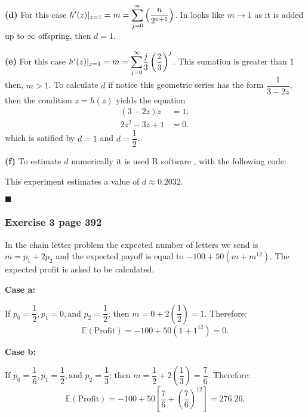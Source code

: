 \documentclass[10pt,leter,openany]{article}
\begin{document}
			\textbf{(d)} For this case $h'(z)|_{z=1} = m = \mathlarger\sum_{j=0}^{\infty} \left( \dfrac{n}{2^{n+1}}\right)$. In looks like $m \rightarrow 1$ as it is added up to $\infty$ offspring, then $d = 1$.

			\textbf{(e)} For this case $h'(z)|_{z=1} = m = \mathlarger\sum_{j=0}^{\infty}  \dfrac{j}{3} \left( \dfrac{2}{3}\right) ^{j}$. This sumation is greater than 1 then, $m > 1$. To calculate $d$ if notice this geometric series has the form $ \dfrac{1}{3-2z}$, then the condition $z = h(z)$ yields the equation \begin{equation*}
				\begin{aligned}
				(3-2z)z & = 1,\\
				2z^{2}- 3z + 1& = 0.
			\end{aligned}
			\end{equation*} which is satified by $ d = 1 $ and $ d = \dfrac{1}{2}$. 
		
		\textbf{(f)} To estimate $d$ numerically it is used R software \citep{r}, with the following code:
		
		
		This experiment estimates a value of $d \approx 0.2032$.
			
						\begin{flushright}
							$\blacksquare $ 
						\end{flushright}
					
		\subsubsection{Exercise 3 page 392}
		
			In the chain letter problem the expected number of letters we send is $ m = p_{1} + 2p_{2}$ and the expected payoff is equal to $-100 + 50(m+m^{12})$. The expected profit is asked to be calculated.
			
			\textbf{Case a:}
			
			If $p_{0} = \dfrac{1}{2}, p_{1} = 0, \mbox{and } p_{2}=\dfrac{1}{2}$; then $m = 0+ 2\left( \dfrac{1}{2}\right) = 1$. Therefore: \begin{equation*}
				\mathbb{E}(\mbox{Profit}) = -100 + 50(1+1^{12}) = 0.
			\end{equation*}
			
			\textbf{Case b:}
			
			If $p_{0} = \dfrac{1}{6}, p_{1} = \dfrac{1}{2}, \mbox{and } p_{2}=\dfrac{1}{3}$; then $m = \dfrac{1}{2}+ 2\left( \dfrac{1}{3}\right) = \dfrac{7}{6}$. Therefore: \begin{equation*}
				\mathbb{E}(\mbox{Profit}) = -100 + 50\left[ \dfrac{7}{6}+\left( \dfrac{7}{6}\right) ^{12}\right]  = 276.26.
			\end{equation*}
		
\end{document}
